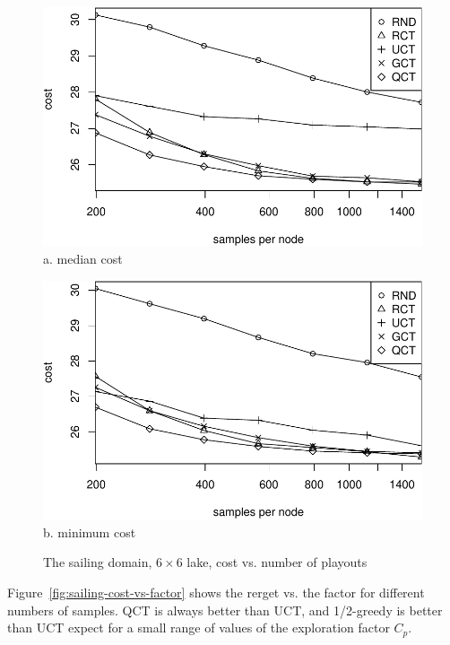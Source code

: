 \documentclass{article}
\begin{document}
\begin{figure}[ht]
  \begin{minipage}[b]{0.5\linewidth}
    \centering
    \includegraphics[scale=0.45]{costs-size=6-group=median.pdf}\\
    a. median cost
  \end{minipage}
  \begin{minipage}[b]{0.5\linewidth}
    \centering
    \includegraphics[scale=0.45]{costs-size=6-group=minimum.pdf}\\
    b. minimum cost
  \end{minipage}
  \caption{The sailing domain, $6\times 6$ lake, cost vs. number of playouts}
  \label{fig:sailing-cost-vs-nsamples}
\end{figure}

Figure~\ref{fig:sailing-cost-vs-factor} shows the rerget vs. the
factor for different numbers of samples. QCT is always better than
UCT, and 1/2-greedy is better than UCT expect for a small range of
values of the exploration factor $C_p$. 
\end{document}
